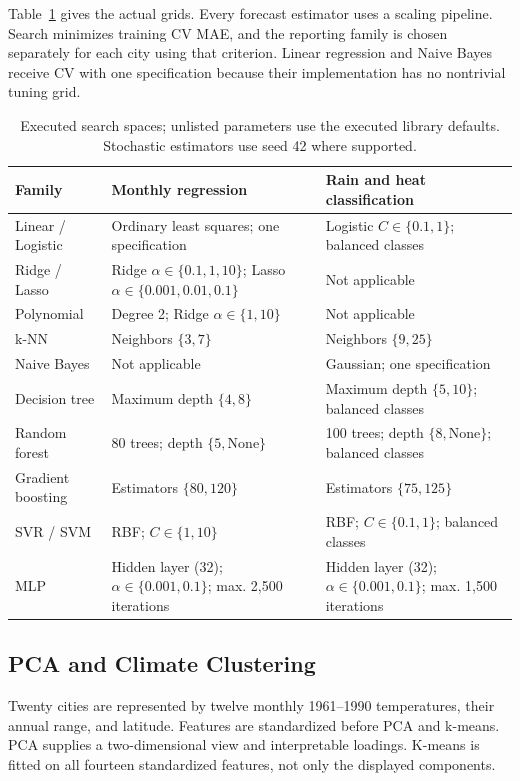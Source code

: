 \documentclass[conference]{IEEEtran}
\begin{document}
Table~\ref{tab:search} gives the actual grids. Every forecast estimator uses a scaling pipeline. Search minimizes training CV MAE, and the reporting family is chosen separately for each city using that criterion. Linear regression and Naive Bayes receive CV with one specification because their implementation has no nontrivial tuning grid.
\begin{table}[!tbp]
\caption{Executed search spaces; unlisted parameters use the executed library defaults. Stochastic estimators use seed 42 where supported.}\label{tab:search}\centering\footnotesize
\begin{tabular}{p{}p{}p{}}
\toprule Family & Monthly regression & Rain and heat classification \\\midrule
Linear / Logistic & Ordinary least squares; one specification & Logistic $C\in\{0.1,1\}$; balanced classes \\
Ridge / Lasso & Ridge $\alpha\in\{0.1,1,10\}$; Lasso $\alpha\in\{0.001,0.01,0.1\}$ & Not applicable \\
Polynomial & Degree 2; Ridge $\alpha\in\{1,10\}$ & Not applicable \\
k-NN & Neighbors $\{3,7\}$ & Neighbors $\{9,25\}$ \\
Naive Bayes & Not applicable & Gaussian; one specification \\
Decision tree & Maximum depth $\{4,8\}$ & Maximum depth $\{5,10\}$; balanced classes \\
Random forest & 80 trees; depth $\{5,\mathrm{None}\}$ & 100 trees; depth $\{8,\mathrm{None}\}$; balanced classes \\
Gradient boosting & Estimators $\{80,120\}$ & Estimators $\{75,125\}$ \\
SVR / SVM & RBF; $C\in\{1,10\}$ & RBF; $C\in\{0.1,1\}$; balanced classes \\
MLP & Hidden layer (32); $\alpha\in\{0.001,0.1\}$; max. 2,500 iterations & Hidden layer (32); $\alpha\in\{0.001,0.1\}$; max. 1,500 iterations \\\bottomrule
\end{tabular}\end{table}

\subsection{PCA and Climate Clustering}
Twenty cities are represented by twelve monthly 1961--1990 temperatures, their annual range, and latitude. Features are standardized before PCA and k-means. PCA supplies a two-dimensional view and interpretable loadings. K-means is fitted on all fourteen standardized features, not only the displayed components.
\end{document}
